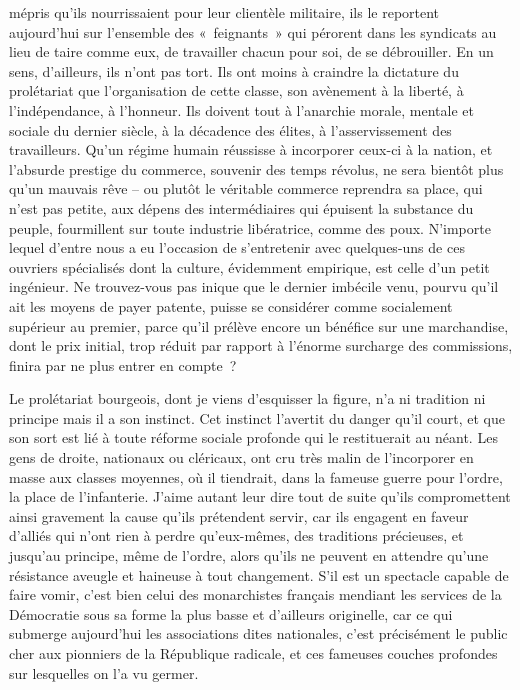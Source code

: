 \documentclass[french,twoside]{book} %
\begin{document}
mépris qu’ils nourrissaient pour leur clientèle militaire, ils le reportent aujourd’hui sur l’ensemble des « feignants » qui pérorent dans les syndicats au lieu de taire comme eux, de travailler chacun pour soi, de se débrouiller. En un sens, d’ailleurs, ils n’ont pas tort. Ils ont moins à craindre la dictature du prolétariat que l’organisation de cette classe, son avènement à la liberté, à l’indépendance, à l’honneur. Ils doivent tout à l’anarchie morale, mentale et sociale du dernier siècle, à la décadence des élites, à l’asservissement des travailleurs. Qu’un régime humain réussisse à incorporer ceux-ci à la nation, et l’absurde prestige du commerce, souvenir des temps révolus, ne sera bientôt plus qu’un mauvais rêve – ou plutôt le véritable commerce reprendra sa place, qui n’est pas petite, aux dépens des intermédiaires qui épuisent la substance du peuple, fourmillent sur toute industrie libératrice, comme des poux. N’importe lequel d’entre nous a eu l’occasion de s’entretenir avec quelques-uns de ces ouvriers spécialisés dont la culture, évidemment empirique, est celle d’un petit ingénieur. Ne trouvez-vous pas inique que le dernier imbécile venu, pourvu qu’il ait les moyens de payer patente, puisse se considérer comme socialement supérieur au premier, parce qu’il prélève encore un bénéfice sur une marchandise, dont le prix initial, trop réduit par rapport à l’énorme surcharge des commissions, finira par ne plus entrer en compte ?\par
Le prolétariat bourgeois, dont je viens d’esquisser la figure, n’a ni tradition ni principe mais il a son instinct. Cet instinct l’avertit du danger qu’il court, et que son sort est lié à toute réforme sociale profonde qui le restituerait au néant. Les gens de droite, nationaux ou cléricaux, ont cru très malin de l’incorporer en masse aux classes moyennes, où il tiendrait, dans la fameuse guerre pour l’ordre, la place de l’infanterie. J’aime autant leur dire tout de suite qu’ils compromettent ainsi gravement la cause qu’ils prétendent servir, car ils engagent en faveur d’alliés qui n’ont rien à perdre qu’eux-mêmes, des traditions précieuses, et jusqu’au principe, même de l’ordre, alors qu’ils ne peuvent en attendre qu’une résistance aveugle et haineuse à tout changement. S’il est un spectacle capable de faire vomir, c’est bien celui des monarchistes français mendiant les services de la Démocratie sous sa forme la plus basse et d’ailleurs originelle, car ce qui submerge aujourd’hui les associations dites nationales, c’est précisément le public cher aux pionniers de la République radicale, et ces fameuses couches profondes sur lesquelles on l’a vu germer.\par
\end{document}
